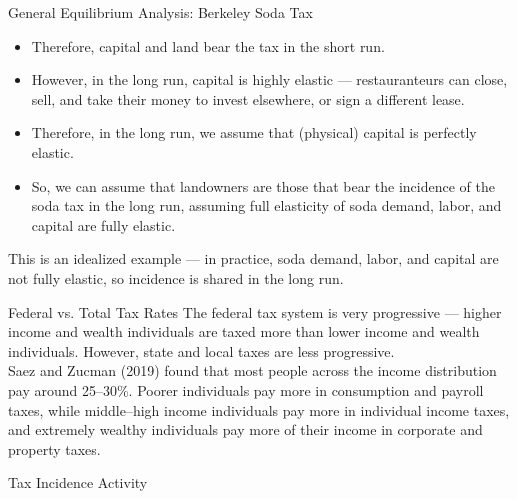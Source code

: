 \documentclass[10pt]{extarticle}
\begin{document}
\begin{problem}{General Equilibrium Analysis: Berkeley Soda Tax}
\begin{description}
\begin{itemize}
          \item Therefore, capital and land bear the tax in the short run.
        \end{itemize}
      \item[Long Run Incidence:]\hfill
        \begin{itemize}
          \item However, in the long run, capital is highly elastic --- restauranteurs can close, sell, and take their money to invest elsewhere, or sign a different lease.
          \item Therefore, in the long run, we assume that (physical) capital is perfectly elastic.
          \item So, we can assume that landowners are those that bear the incidence of the soda tax in the long run, assuming full elasticity of soda demand, labor, and capital are fully elastic.
        \end{itemize}
    \end{description}
    This is an idealized example --- in practice, soda demand, labor, and capital are not fully elastic, so incidence is shared in the long run.
  \end{problem}
  \begin{problem}{Federal vs. Total Tax Rates}
    The federal tax system is very progressive --- higher income and wealth individuals are taxed more than lower income and wealth individuals. However, state and local taxes are less progressive.\\

    Saez and Zucman (2019) found that most people across the income distribution pay around 25--30\%. Poorer individuals pay more in consumption and payroll taxes, while middle--high income individuals pay more in individual income taxes, and extremely wealthy individuals pay more of their income in corporate and property taxes.
  \end{problem}
  \begin{problem}{Tax Incidence Activity}
    \begin{tcbraster}[raster columns = 1,colframe = black!75!white,colback=white]
    \end{tcbraster}
  \end{problem}
\end{document}

